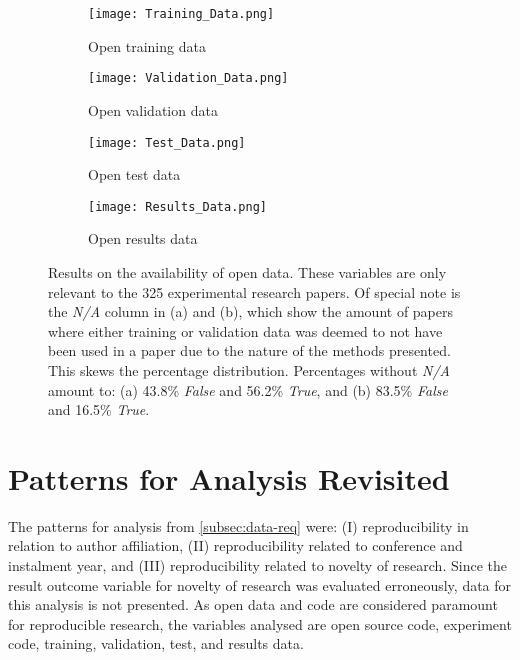 \begin{figure}[!htb]
\begin{center}
    \begin{subfigure}[b]{0.4\textwidth}
        \texttt{[image: Training\_Data.png]}
        \caption{Open training data}
        \label{fig:training}
    \end{subfigure}
    \begin{subfigure}[b]{0.4\textwidth}
        \texttt{[image: Validation\_Data.png]}
        \caption{Open validation data}
        \label{fig:validation}
    \end{subfigure}
    \begin{subfigure}[b]{0.4\textwidth}
        \texttt{[image: Test\_Data.png]}
        \caption{Open test data}
        \label{fig:test}
    \end{subfigure}
    \begin{subfigure}[b]{0.4\textwidth}
        \texttt{[image: Results\_Data.png]}
        \caption{Open results data}
        \label{fig:results}
    \end{subfigure}
    \caption[Open data results.]{Results on the availability of open data. These variables are only relevant to the 325 experimental research papers. Of special note is the \emph{N/A} column in (a) and (b), which show the amount of papers where either training or validation data was deemed to not have been used in a paper due to the nature of the methods presented. This skews the percentage distribution. Percentages without \emph{N/A} amount to: (a) 43.8\% \emph{False} and 56.2\% \emph{True}, and (b) 83.5\% \emph{False} and 16.5\% \emph{True}.}
    \label{fig:open_data}
\end{center}
\end{figure}

\section{Patterns for Analysis Revisited}
The patterns for analysis from \ref{subsec:data-req} were: (I) reproducibility in relation to author affiliation, (II) reproducibility related to conference and instalment year, and (III) reproducibility related to novelty of research. Since the result outcome variable for novelty of research was evaluated erroneously, data for this analysis is not presented. As open data and code are considered paramount for reproducible research, the variables analysed are open source code, experiment code, training, validation, test, and results data.

